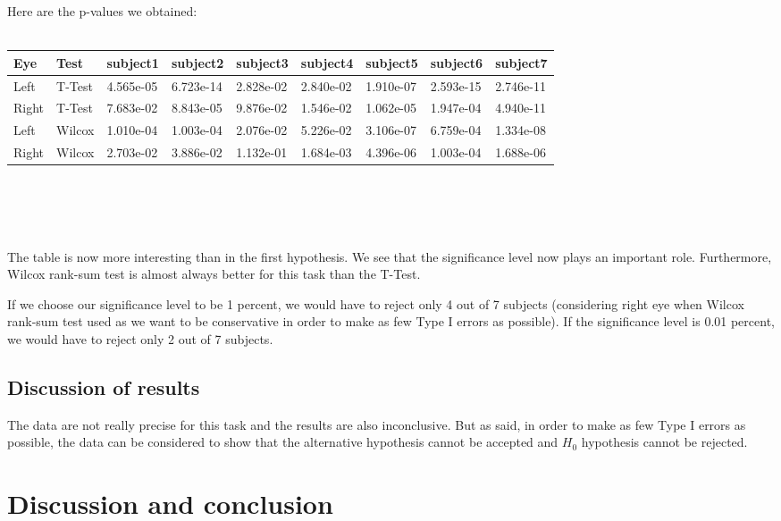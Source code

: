 \documentclass[a4paper]{article}
\begin{document}
Here are the p-values we obtained:
\\
\\
\begin{tabular}{ |p{0.7cm}|p{1.3cm}|p{1.5cm}|p{1.5cm}|p{1.5cm}|p{1.5cm}|p{1.5cm}|p{1.5cm}|p{1.5cm}|  }
 \hline
 Eye & Test & subject1 & subject2 & subject3 & subject4 & subject5 & subject6 & subject7 \\
 \hline
 Left & T-Test & 4.565e-05 & 6.723e-14 & 2.828e-02 & 2.840e-02 & 1.910e-07 & 2.593e-15 & 2.746e-11\\
 Right & T-Test & 7.683e-02 & 8.843e-05 & 9.876e-02 & 1.546e-02 & 1.062e-05 & 1.947e-04 & 4.940e-11\\
 Left & Wilcox & 1.010e-04 & 1.003e-04 & 2.076e-02 & 5.226e-02 & 3.106e-07 & 6.759e-04 & 1.334e-08\\
 Right & Wilcox & 2.703e-02 & 3.886e-02 & 1.132e-01 & 1.684e-03 & 4.396e-06 & 1.003e-04 & 1.688e-06\\
 \hline
\end{tabular}
\\
\\
\\
\\
The table is now more interesting than in the first hypothesis. We see that the significance level now plays an important role.
Furthermore, Wilcox rank-sum test is almost always better for this task than the T-Test.

If we choose our significance level to be 1 percent, we would have to reject only 4 out of 7 subjects (considering right eye when Wilcox rank-sum test used
as we want to be conservative in order to make as few Type I errors as possible). If the significance level is 0.01 percent, we would have to reject only 2 out of 7
subjects.

\subsection{Discussion of results}

The data are not really precise for this task and the results are also inconclusive. But as said, in order to make as few Type I errors as possible,
the data can be considered to show that the alternative hypothesis cannot be accepted and $H_0$ hypothesis cannot be rejected.

\section{Discussion and conclusion}
\end{document}
